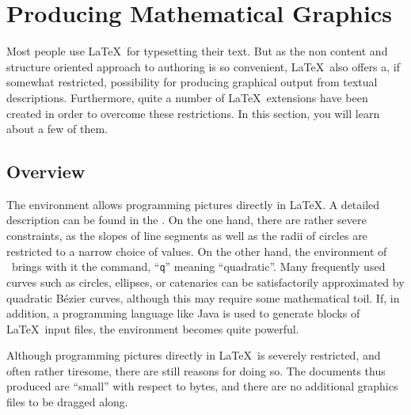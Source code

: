 \setcounter{chapter}{4}
\newcommand{\graphicscompanion}{\emph{The \LaTeX{} Graphics Companion}~\cite{graphicscompanion}} 
\newcommand{\hobby}{\emph{A User's Manual for MetaPost}~\cite{metapost}}
\newcommand{\hoenig}{\emph{\TeX{} Unbound}~\cite{unbound}}
\newcommand{\graphicsinlatex}{\emph{Graphics in \LaTeXe{}}~\cite{ursoswald}}

\chapter{Producing Mathematical Graphics}

\begin{intro}
Most people use \LaTeX\ for typesetting their text. But as the non content and
structure oriented approach to authoring is so convenient, \LaTeX\ also offers a,
if somewhat restricted, possibility for producing graphical output from textual 
descriptions. Furthermore, quite a number of \LaTeX\ extensions have been created 
in order to overcome these restrictions. In this section, you will learn about a 
few of them.
\end{intro}

\section{Overview}

The  environment allows programming pictures directly in
\LaTeX. A detailed
description can be found in the \manual. On the one hand, there are rather
severe constraints, as the slopes of line segments as well as the radii of
circles are restricted to a narrow choice of values.  On the other hand, the
 environment of \LaTeXe\ brings with it the 
command, ``\texttt{q}'' meaning ``quadratic''.  Many frequently used curves
such as circles, ellipses, or catenaries can be satisfactorily approximated
by quadratic B\'ezier curves, although this may require some mathematical
toil. If, in addition, a programming language like Java is used to generate
 blocks of \LaTeX\ input files, the  environment
becomes quite powerful.

Although programming pictures directly in \LaTeX\ is severely restricted,
and often rather tiresome, there are still reasons for doing so. The documents
thus produced are ``small'' with respect to bytes, and there are no additional
graphics files to be dragged along.

